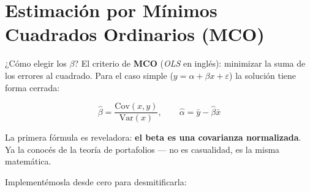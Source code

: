 \documentclass[
  spanish,
  letterpaper,
  DIV=11,
  numbers=noendperiod]{scrreprt}
\begin{document}
\section{Estimación por Mínimos Cuadrados Ordinarios
(MCO)}\label{estimaciuxf3n-por-muxednimos-cuadrados-ordinarios-mco}

¿Cómo elegir los \(\beta\)? El criterio de \textbf{MCO} (\emph{OLS} en
inglés): minimizar la suma de los errores al cuadrado. Para el caso
simple (\(y = \alpha + \beta x + \varepsilon\)) la solución tiene forma
cerrada:

\[\hat\beta = \frac{\text{Cov}(x, y)}{\text{Var}(x)}, \qquad \hat\alpha = \bar{y} - \hat\beta \bar{x}\]

La primera fórmula es reveladora: \textbf{el beta es una covarianza
normalizada}. Ya la conocés de la teoría de portafolios --- no es
casualidad, es la misma matemática.

Implementémosla desde cero para desmitificarla:
\end{document}
